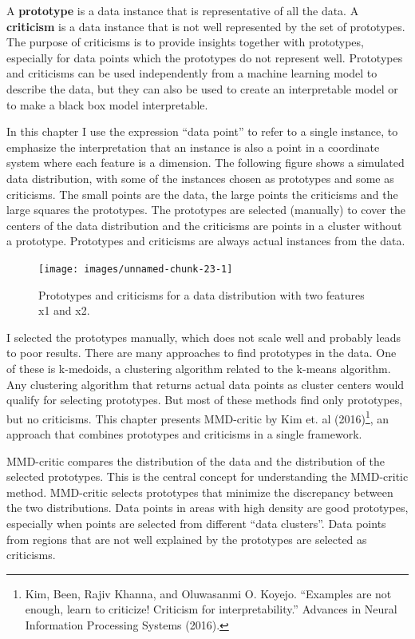 \documentclass[
  12pt,
]{krantz}
\begin{document}
A \textbf{prototype} is a data instance that is representative of all the data.
A \textbf{criticism} is a data instance that is not well represented by the set of prototypes.
The purpose of criticisms is to provide insights together with prototypes, especially for data points which the prototypes do not represent well.
Prototypes and criticisms can be used independently from a machine learning model to describe the data, but they can also be used to create an interpretable model or to make a black box model interpretable.

In this chapter I use the expression ``data point'' to refer to a single instance, to emphasize the interpretation that an instance is also a point in a coordinate system where each feature is a dimension.
The following figure shows a simulated data distribution, with some of the instances chosen as prototypes and some as criticisms.
The small points are the data, the large points the criticisms and the large squares the prototypes.
The prototypes are selected (manually) to cover the centers of the data distribution and the criticisms are points in a cluster without a prototype.
Prototypes and criticisms are always actual instances from the data.

\begin{figure}

{\centering \texttt{[image: images/unnamed-chunk-23-1]} 

}

\caption{Prototypes and criticisms for a data distribution with two features x1 and x2.}\label{fig:unnamed-chunk-23}
\end{figure}

I selected the prototypes manually, which does not scale well and probably leads to poor results.
There are many approaches to find prototypes in the data.
One of these is k-medoids, a clustering algorithm related to the k-means algorithm.
Any clustering algorithm that returns actual data points as cluster centers would qualify for selecting prototypes.
But most of these methods find only prototypes, but no criticisms.
This chapter presents MMD-critic by Kim et. al (2016)\footnote{Kim, Been, Rajiv Khanna, and Oluwasanmi O. Koyejo. ``Examples are not enough, learn to criticize! Criticism for interpretability.'' Advances in Neural Information Processing Systems (2016).}, an approach that combines prototypes and criticisms in a single framework.

MMD-critic compares the distribution of the data and the distribution of the selected prototypes.
This is the central concept for understanding the MMD-critic method.
MMD-critic selects prototypes that minimize the discrepancy between the two distributions.
Data points in areas with high density are good prototypes, especially when points are selected from different ``data clusters''.
Data points from regions that are not well explained by the prototypes are selected as criticisms.
\end{document}
